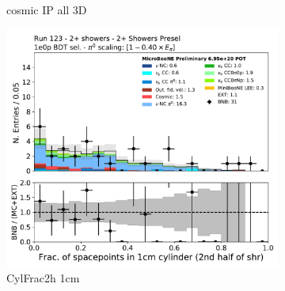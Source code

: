 \begin{figure}[H]
\begin{subfigure}{0.3\textwidth}
    \caption{cosmic IP all 3D}
    \end{subfigure}
    \begin{subfigure}{0.3\textwidth}
    \includegraphics[width=1.0\textwidth]{Sidebands/Figures/TwoShr_1e0pSel/BDT/CylFrac2h_1cm.pdf}
    \caption{CylFrac2h 1cm}
    \end{subfigure}
    \caption{} 
    \label{fig:HE_1eNp_1}
\end{figure}

